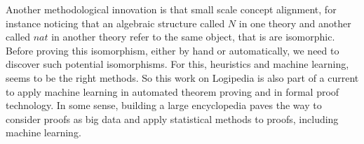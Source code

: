 Another methodological innovation is that small scale concept
alignment, for instance noticing that an algebraic structure called
$N$ in one theory and another called $nat$ in another theory refer to
the same object, that is are isomorphic. Before proving this
isomorphism, either by hand or automatically, we need to discover such
potential isomorphisms. For this, heuristics and machine learning,
seems to be the right methods. So this work on Logipedia is also part
of a current to apply machine learning in automated theorem proving
and in formal proof technology. In some sense, building a large
encyclopedia paves the way to consider proofs as big data and apply
statistical methods to proofs, including machine learning.

